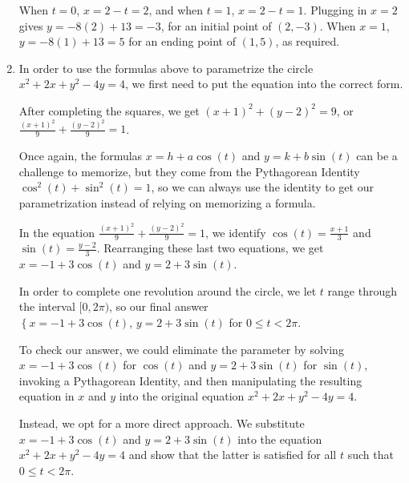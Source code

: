 \begin{ex}
\begin{enumerate}
     When $t=0$, $x= 2-t = 2$, and  when $t=1$, $x = 2-t = 1$.  Plugging in $x=2$ gives $y = -8(2)+13 = -3$, for an initial point of $(2,-3)$.  When  $x = 1$,  $y = -8(1)+13 = 5$ for an ending point of $(1,5)$, as required.

\item In order to use the formulas above to parametrize the circle $x^2 + 2x + y^2 - 4y = 4$, we first need to put the equation into the correct form.  

\smallskip

After completing the squares, we get $(x+1)^2+(y-2)^2 = 9$, or $\frac{(x+1)^2}{9} + \frac{(y-2)^2}{9} = 1$.  

\smallskip

Once again, the formulas $x = h+a\cos(t)$ and $y=k+b\sin(t)$ can be a challenge to memorize, but they come from the Pythagorean Identity $\cos^{2}(t) + \sin^{2}(t) = 1$, so we can always use the identity to get our parametrization instead of relying on memorizing a formula.

\smallskip

In the equation $\frac{(x+1)^2}{9} + \frac{(y-2)^2}{9} = 1$, we identify $\cos(t) = \frac{x+1}{3}$ and $\sin(t) = \frac{y-2}{3}$.  Rearranging these last two equations, we get $x = -1+3 \cos(t)$ and $y = 2 +3 \sin(t)$.  

\smallskip

 In order to complete one revolution around the circle, we let $t$ range through the interval $[0,2\pi)$, so   our final answer $\left\{ x = -1+3 \cos(t), \, y = 2 +3 \sin(t) \right.$ for $0 \leq t < 2\pi$.  
 
 \smallskip
 
 To check our answer, we could eliminate the parameter by solving  $x = -1+3\cos(t)$ for $\cos(t)$ and $y = 2+3\sin(t)$ for $\sin(t)$, invoking a Pythagorean Identity, and then manipulating the resulting equation in $x$ and $y$ into the original equation  $x^2+2x+y^2-4y = 4$.  
 
 \smallskip
 
 Instead, we opt for a more direct approach.  We substitute $x = -1+3\cos(t)$ and $y = 2+3\sin(t)$ into the equation $x^2 + 2x + y^2 - 4y = 4$ and show that the latter is satisfied for all $t$ such that $0 \leq t < 2\pi$.

\[ \begin{array}{rcl}


\end{array}\]
\end{enumerate}
\end{ex}
